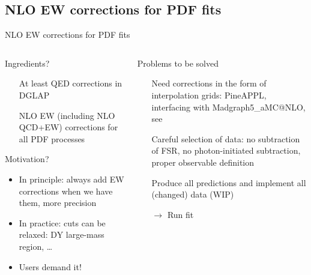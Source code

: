 \author[Christopher Schwan]{}

\subsection{NLO EW corrections for PDF fits}

\begin{frame}{NLO EW corrections for PDF fits}
\fontsize{9}{11}\selectfont
\begin{columns}[onlytextwidth]
\begin{column}{0.45\textwidth}

\begin{block}{Ingredients?}
\begin{itemize}
\item[\ding{51}] At least QED corrections in DGLAP
\item[\ding{55}] NLO EW (including NLO QCD+EW) corrections for all PDF processes
\end{itemize}
\end{block}

\vspace*{0.5cm}

\begin{block}{Motivation?}
\begin{itemize}
\item In principle: always add EW corrections when we have them, more precision
\item In practice: cuts can be relaxed: DY large-mass region, \ldots
\item Users demand it!
\end{itemize}
\end{block}
\end{column}
\begin{column}{0.45\textwidth}
\begin{block}{Problems to be solved}
\begin{itemize}
\item[\ding{51}] Need corrections in the form of \alert{interpolation grids}: PineAPPL, interfacing with Madgraph5\_aMC@NLO, see\\
\item[\ding{51}] Careful selection of data: no subtraction of FSR, no photon-initiated subtraction, proper observable definition
\item[\ding{55}] Produce all predictions and implement all (changed) data (WIP)
\item[$\rightarrow$] Run fit
\end{itemize}
\end{block}
\end{column}
\end{columns}
\end{frame}

